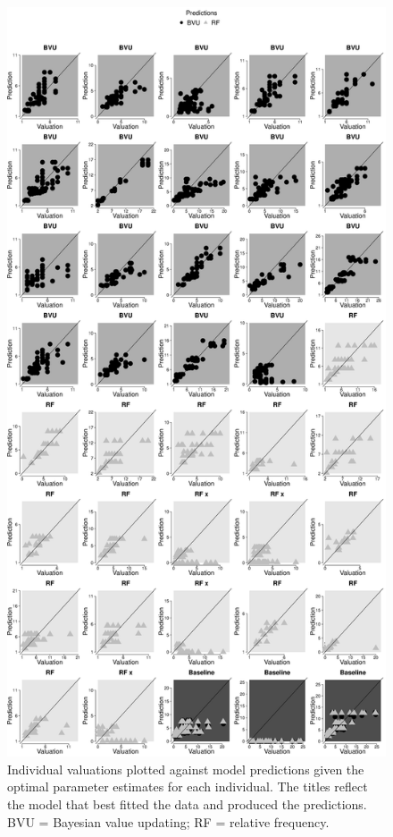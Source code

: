\documentclass[a4paper,man, natbib]{apa6} %
\begin{document}
\begin{figure}[htbp] 
  \centering
\includegraphics[width=.9\linewidth, height = .9\textheight, keepaspectratio]{modelcomp1_qual.eps}%
    \caption{Individual valuations plotted against model predictions given the optimal parameter estimates for each individual. The titles reflect the model that best fitted the data and produced the predictions. BVU = Bayesian value updating; RF = relative frequency.}
  \label{fig:ind.fits1}
\end{figure}
\end{document}
